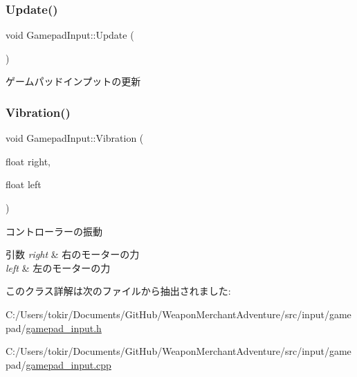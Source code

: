 \subsubsection{\texorpdfstring{Update()}{Update()}}
{\footnotesize\ttfamily void Gamepad\+Input\+::\+Update (\begin{DoxyParamCaption}{ }\end{DoxyParamCaption})}



ゲームパッドインプットの更新 

\mbox{\label{class_gamepad_input_ac78cf60cd63a1b1d53510dd7193b5fcb}} 
\subsubsection{\texorpdfstring{Vibration()}{Vibration()}}
{\footnotesize\ttfamily void Gamepad\+Input\+::\+Vibration (\begin{DoxyParamCaption}\item[{float}]{right,  }\item[{float}]{left }\end{DoxyParamCaption})}



コントローラーの振動 


\begin{DoxyParams}{引数}
{\em right} & 右のモーターの力 \\
\hline
{\em left} & 左のモーターの力 \\
\hline
\end{DoxyParams}


このクラス詳解は次のファイルから抽出されました\+:\begin{DoxyCompactItemize}
\item 
C\+:/\+Users/tokir/\+Documents/\+Git\+Hub/\+Weapon\+Merchant\+Adventure/src/input/gamepad/\mbox{\hyperlink{gamepad__input_8h}{gamepad\+\_\+input.\+h}}\item 
C\+:/\+Users/tokir/\+Documents/\+Git\+Hub/\+Weapon\+Merchant\+Adventure/src/input/gamepad/\mbox{\hyperlink{gamepad__input_8cpp}{gamepad\+\_\+input.\+cpp}}\end{DoxyCompactItemize}
